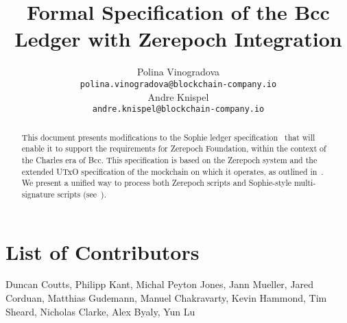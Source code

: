 

\cleardoublepage
\renewcommand{\thepage}{\arabic{page}}
\setcounter{page}{1}

\title{Formal Specification of the Bcc Ledger with Zerepoch
Integration}

\author{
   Polina Vinogradova \\ {\small \texttt{polina.vinogradova@blockchain-company.io}} \\
   Andre Knispel \\ {\small \texttt{andre.knispel@blockchain-company.io}} \\
   }

\date{}

\maketitle

\begin{abstract}
This document presents modifications to the Sophie ledger
specification~\cite{sophie_spec} that will enable it to support the requirements for Zerepoch Foundation, within the context of the Charles era
of Bcc. This specification is based on the Zerepoch system and the extended
UTxO specification of the mockchain on which it operates, as outlined in~\cite{chakravarty2020extended}.
%
We present a unified way to process both Zerepoch scripts and Sophie-style multi-signature scripts
(see~\cite{multi_sig}).
\end{abstract}

\section*{List of Contributors}
\label{acknowledgements}

Duncan Coutts,
Philipp Kant,
Michal Peyton Jones,
Jann Mueller,
Jared Corduan,
Matthias Gudemann,
Manuel Chakravarty,
Kevin Hammond,
Tim Sheard,
Nicholas Clarke,
Alex Byaly,
Yun Lu
